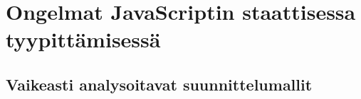 \chapter{Ongelmat JavaScriptin staattisessa tyypittämisessä}
\section{Vaikeasti analysoitavat suunnittelumallit}